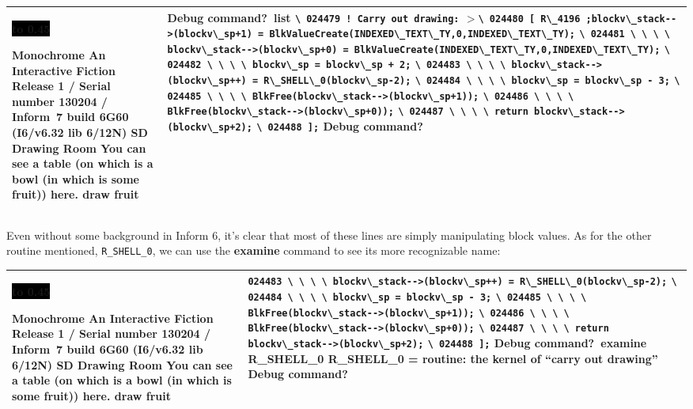 \documentclass{book}
\newcommand{\n}{\hspace*{\fill}\newline}
\newcommand{\terp}[2]{\begin{center}\begin{tabular}{p{0.45\textwidth}|p{0.45\textwidth}}\midrule #1&#2\\\midrule\end{tabular}\end{center}}
\newcommand{\glkheading}[1]{\textbf{#1}}
\newcommand{\glkinput}[1]{\textbf{#1}}
\newcommand{\glkstatusline}[2]{\centerline{\colorbox{black}{\hbox to 0.45\textwidth{\textcolor{white}{#1\hfil #2}}}}}
\newcommand{\storyprompt}{\raisebox{1.5pt}{\(>\)}}
\newcommand{\cursor}{\raisebox{-1.5pt}{\RectangleThin}}
\newcommand{\markedindent}{\(>\)}
\newcommand{\unmarkedindent}{\hphantom{\(>\)}}
\newcommand{\unmarkedindentb}{\qquad\hphantom{\(>\)}}
\begin{document}
\terp{\glkstatusline{Drawing Room}{0/1}\n
  \glkheading{Monochrome}\n
  An Interactive Fiction\n
  Release 1 / Serial number 130204 / Inform~7 build 6G60 (I6/v6.32 lib 6/12N) SD\n
  \n
  \glkheading{Drawing Room}\n
  You can see a table (on which is a bowl (in which is some fruit)) here.\n
  \n
  \storyprompt\glkinput{draw fruit}}{%
  Debug command?\ \glkinput{list}\n
  \n
  \unmarkedindent \lstinline{\ 024479 ! Carry out drawing:}\n
  \markedindent \lstinline{\ 024480 [ R\_4196 ;blockv\_stack-->(blockv\_sp+1) = BlkValueCreate(INDEXED\_TEXT\_TY,0,INDEXED\_TEXT\_TY);}\n
  \unmarkedindent \lstinline{\ 024481 \ \ \ \ blockv\_stack-->(blockv\_sp+0) = BlkValueCreate(INDEXED\_TEXT\_TY,0,INDEXED\_TEXT\_TY);}\n
  \unmarkedindent \lstinline{\ 024482 \ \ \ \ blockv\_sp = blockv\_sp + 2;}\n
  \unmarkedindent \lstinline{\ 024483 \ \ \ \ blockv\_stack-->(blockv\_sp++) = R\_SHELL\_0(blockv\_sp-2);}\n
  \unmarkedindent \lstinline{\ 024484 \ \ \ \ blockv\_sp = blockv\_sp - 3;}\n
  \unmarkedindent \lstinline{\ 024485 \ \ \ \ BlkFree(blockv\_stack-->(blockv\_sp+1));}\n
  \unmarkedindent \lstinline{\ 024486 \ \ \ \ BlkFree(blockv\_stack-->(blockv\_sp+0));}\n
  \unmarkedindent \lstinline{\ 024487 \ \ \ \ return blockv\_stack-->(blockv\_sp+2);}\n
  \unmarkedindent \lstinline{\ 024488 ];}\n
  \n
  Debug command?\ \cursor}

Even without some background in Inform 6, it's clear that most of these lines
are simply manipulating block values.  As for the other routine mentioned,
\lstinline{R_SHELL_0}, we can use the \glkinput{examine} command to see its more
recognizable name:

\terp{\glkstatusline{Drawing Room}{0/1}\n
  \glkheading{Monochrome}\n
  An Interactive Fiction\n
  Release 1 / Serial number 130204 / Inform~7 build 6G60 (I6/v6.32 lib 6/12N) SD\n
  \n
  \glkheading{Drawing Room}\n
  You can see a table (on which is a bowl (in which is some fruit)) here.\n
  \n
  \storyprompt\glkinput{draw fruit}}{%
  \unmarkedindentb \lstinline{024483 \ \ \ \ blockv\_stack-->(blockv\_sp++) = R\_SHELL\_0(blockv\_sp-2);}\n
  \unmarkedindent \lstinline{\ 024484 \ \ \ \ blockv\_sp = blockv\_sp - 3;}\n
  \unmarkedindent \lstinline{\ 024485 \ \ \ \ BlkFree(blockv\_stack-->(blockv\_sp+1));}\n
  \unmarkedindent \lstinline{\ 024486 \ \ \ \ BlkFree(blockv\_stack-->(blockv\_sp+0));}\n
  \unmarkedindent \lstinline{\ 024487 \ \ \ \ return blockv\_stack-->(blockv\_sp+2);}\n
  \unmarkedindent \lstinline{\ 024488 ];}\n
  \n
  Debug command?\ \glkinput{examine R\_SHELL\_0}\n
  \n
  R\_SHELL\_0 = routine: the kernel of ``carry out drawing''\n
  \n
  Debug command?\ \cursor}
\end{document}
